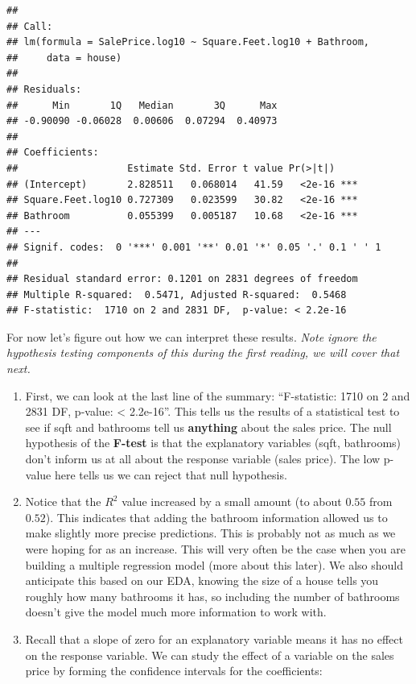 \documentclass[
]{book}
\theoremstyle{definition}
\theoremstyle{definition}
\theoremstyle{definition}
\theoremstyle{definition}
\theoremstyle{remark}
\begin{document}
\begin{verbatim}
## 
## Call:
## lm(formula = SalePrice.log10 ~ Square.Feet.log10 + Bathroom, 
##     data = house)
## 
## Residuals:
##      Min       1Q   Median       3Q      Max 
## -0.90090 -0.06028  0.00606  0.07294  0.40973 
## 
## Coefficients:
##                   Estimate Std. Error t value Pr(>|t|)    
## (Intercept)       2.828511   0.068014   41.59   <2e-16 ***
## Square.Feet.log10 0.727309   0.023599   30.82   <2e-16 ***
## Bathroom          0.055399   0.005187   10.68   <2e-16 ***
## ---
## Signif. codes:  0 '***' 0.001 '**' 0.01 '*' 0.05 '.' 0.1 ' ' 1
## 
## Residual standard error: 0.1201 on 2831 degrees of freedom
## Multiple R-squared:  0.5471, Adjusted R-squared:  0.5468 
## F-statistic:  1710 on 2 and 2831 DF,  p-value: < 2.2e-16
\end{verbatim}

For now let's figure out how we can interpret these results. \emph{Note ignore the hypothesis testing components of this during the first reading, we will cover that next.}

\begin{enumerate}
\def\labelenumi{\arabic{enumi}.}
\item
  First, we can look at the last line of the summary: ``F-statistic: 1710 on 2 and 2831 DF, p-value: \textless{} 2.2e-16''. This tells us the results of a statistical test to see if sqft and bathrooms tell us \textbf{anything} about the sales price. The null hypothesis of the \textbf{F-test} is that the explanatory variables (sqft, bathrooms) don't inform us at all about the response variable (sales price). The low p-value here tells us we can reject that null hypothesis.
\item
  Notice that the \(R^2\) value increased by a small amount (to about \(0.55\) from \(0.52\)). This indicates that adding the bathroom information allowed us to make slightly more precise predictions. This is probably not as much as we were hoping for as an increase. This will very often be the case when you are building a multiple regression model (more about this later). We also should anticipate this based on our EDA, knowing the size of a house tells you roughly how many bathrooms it has, so including the number of bathrooms doesn't give the model much more information to work with.
\item
  Recall that a slope of zero for an explanatory variable means it has no effect on the response variable. We can study the effect of a variable on the sales price by forming the confidence intervals for the coefficients:
\end{enumerate}
\end{document}
